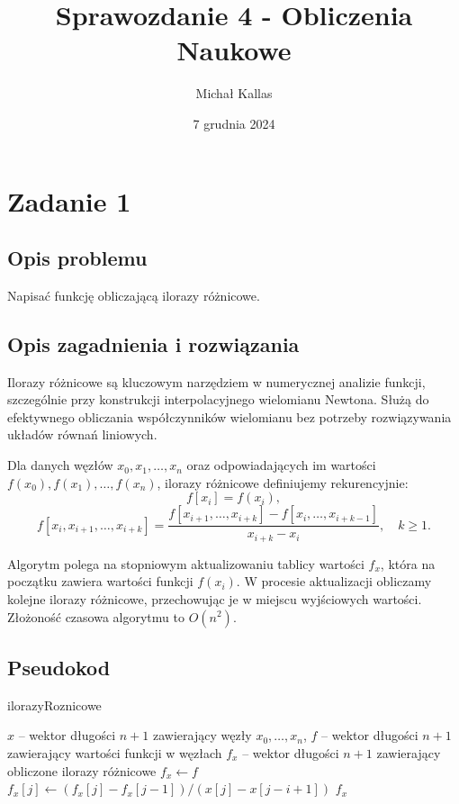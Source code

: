 \documentclass{article}
\title{Sprawozdanie 4 - Obliczenia Naukowe}
\author{Michał Kallas}
\date{7 grudnia 2024}
\begin{document}
\maketitle

\section{Zadanie 1}
\subsection{Opis problemu}
Napisać funkcję obliczającą ilorazy różnicowe.

\subsection{Opis zagadnienia i rozwiązania}

Ilorazy różnicowe są kluczowym narzędziem w numerycznej analizie funkcji, szczególnie przy konstrukcji interpolacyjnego wielomianu Newtona. Służą do efektywnego obliczania współczynników wielomianu bez potrzeby rozwiązywania układów równań liniowych. 

Dla danych węzłów \(x_0, x_1, \dots, x_n\) oraz odpowiadających im wartości \(f(x_0), f(x_1), \dots, f(x_n)\), ilorazy różnicowe definiujemy rekurencyjnie:
\[
f[x_i] = f(x_i),
\]
\[
f[x_i, x_{i+1}, \dots, x_{i+k}] = \frac{f[x_{i+1}, \dots, x_{i+k}] - f[x_i, \dots, x_{i+k-1}]}{x_{i+k} - x_i}, \quad k \geq 1.
\]

Algorytm polega na stopniowym aktualizowaniu tablicy wartości \(f_x\), która na początku zawiera wartości funkcji \(f(x_i)\).
W procesie aktualizacji obliczamy kolejne ilorazy różnicowe, przechowując je w miejscu wyjściowych wartości.
Złożoność czasowa algorytmu to \( O(n^2) \).

\subsection{Pseudokod}
\begin{algorithm}[H]
\caption{ilorazyRoznicowe}
\begin{algorithmic}[1]
\Require $x$ -- wektor długości $n + 1$ zawierający węzły $x_0, \dots, x_n$, $f$ -- wektor długości $n + 1$ zawierający wartości funkcji w węzłach
\Ensure $f_x$ -- wektor długości $n + 1$ zawierający obliczone ilorazy różnicowe
\State $f_x \gets f$
        \State $f_x[j] \gets (f_x[j] - f_x[j-1]) / (x[j] - x[j-i+1])$
    \EndFor
\EndFor
\State \Return $f_x$
\end{algorithmic}
\end{algorithm}
\end{document}
